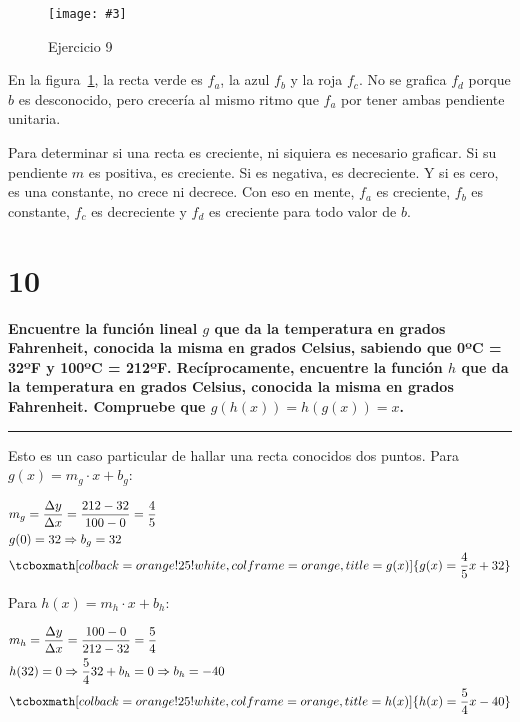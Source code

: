 \documentclass{article}
\newcommand{\hresult}[2]{\tcboxmath[colback=orange!25!white,colframe=orange, title=#1] {#2} }
\newcommand{\figurex}[4]{\begin{figure}[ht] \caption{#1} \texttt{[image: \#3]} \centering \label{#4}\end{figure}}
\newcommand{\sectionx}[1]{\section*{#1}\label{sec:#1}\addcontentsline{toc}{section}{\nameref{sec:#1}}}
\begin{document}
\newpage

\figurex{Ejercicio 9}{3}{../img/guide_01/ex_09.png}{fig:9}

En la figura~\ref{fig:9}, la recta verde es $f_a$, la azul $f_b$ y la roja $f_c$. No se grafica $f_d$ porque $b$ es desconocido, pero crecería al mismo ritmo que $f_a$ por tener ambas pendiente unitaria.

Para determinar si una recta es creciente, ni siquiera es necesario graficar. Si su pendiente $m$ es positiva, es creciente. Si es negativa, es decreciente. Y si es cero, es una constante, no crece ni decrece. Con eso en mente, $f_a$ es creciente, $f_b$ es constante, $f_c$ es decreciente y $f_d$ es creciente para todo valor de $b$.

\sectionx{10}

\textbf{Encuentre la función lineal $g$ que da la temperatura en grados Fahrenheit, conocida la misma en grados Celsius, sabiendo que 0ºC = 32ºF y 100ºC = 212ºF. Recíprocamente, encuentre la función $h$ que da la temperatura en grados Celsius, conocida la misma en grados Fahrenheit. Compruebe que $g(h(x)) = h(g(x)) = x$.}

\vspace{1em}
\hrule
\vspace{1em}

Esto es un caso particular de hallar una recta conocidos dos puntos. Para $g(x) = m_g \cdot x + b_g$:

\begin{subequations}
\begin{align}
& m_g = \frac{\Delta y}{\Delta x} = \frac{212-32}{100-0} = \frac{4}{5} \\
& g(0) = 32 \Rightarrow b_g = 32 \\
& \hresult{g(x)}{  g(x) = \frac{4}{5} x + 32 }
\end{align}
\end{subequations}

Para $h(x) = m_h \cdot x + b_h:$

\begin{subequations}
\begin{align}
& m_h = \frac{\Delta y}{\Delta x} = \frac{100-0}{212-32} = \frac{5}{4} \\
& h(32) = 0 \Rightarrow \frac{5}{4} 32 + b_h = 0 \Rightarrow b_h = -40 \\
& \hresult{h(x)}{  h(x) = \frac{5}{4} x - 40 }
\end{align}
\end{subequations}
\end{document}
